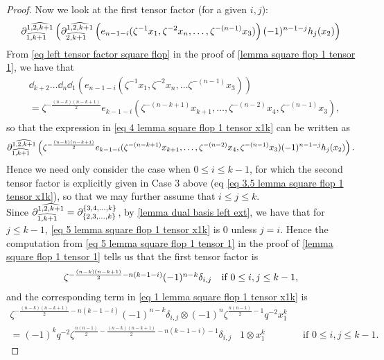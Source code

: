 \begin{proof}
    Now we look at the first tensor factor (for a given $i,j$):
    \begin{align}
        \partial^{\widehat{1,2, k+1}}_{\widehat{1,k+1}}\left(\partial^{\widehat{1,2,k+1}}_{\widehat{2,k+1}}\left(e_{n-1-i}(\zeta^{-1}x_1, \zeta^{-2}x_n, \ldots , \zeta^{-(n-1)}x_3)\right)(-1)^{n-1-j}h_{j}(x_2)\right) \label{eq 4 lemma square flop 1 tensor x1k}
    \end{align}
     From \eqref{eq left tensor factor square flop} in the proof of \cref{lemma square flop 1 tensor 1}, we have that
     \begin{align*}
         &\dd_{k+2}\ldots \dd_n \dd_1 (e_{n-1-i}(\zeta^{-1}x_1, \zeta^{-2}x_n, \ldots \zeta^{-(n-1)}x_3))\\
         &= \zeta^{-\frac{(n-k)(n-k+1)}{2}}e_{k-1-i}(\zeta^{-(n-k+1)}x_{k+1}, \ldots, \zeta^{-(n-2)}x_4, \zeta^{-(n-1)}x_3),
     \end{align*}
     so that the expression in \eqref{eq 4 lemma square flop 1 tensor x1k} can be written as
     \begin{align}
       \partial^{\widehat{1,2, k+1}}_{\widehat{1,k+1}}\left(\zeta^{-\frac{(n-k)(n-k+1)}{2}}e_{k-1-i}(\zeta^{-(n-k+1)}x_{k+1}, \ldots, \zeta^{-(n-2)}x_4, \zeta^{-(n-1)}x_3)(-1)^{n-1-j}h_{j}(x_2)\right) \label{eq 5 lemma square flop 1 tensor x1k}  .
     \end{align}
     Hence we need only consider the case when $0\leq i\leq k-1$,  for which the second tensor factor is explicitly given in Case 3 above (eq \eqref{eq 3.5 lemma square flop 1 tensor x1k}), so that we may further assume that $i\leq j \leq k$.\\
     Since $\partial^{\widehat{1,2,k+1}}_{\widehat{1,k+1}}=\partial^{\{3,4, \ldots, k\}}_{\{2, 3, \ldots, k\}}$, by \cref{lemma dual basis left ext}, we have that for $j\leq k-1$, 
     \eqref{eq 5 lemma square flop 1 tensor x1k} is $0$ unless $j=i$.
     Hence the computation from \eqref{eq 5 lemma square flop 1 tensor 1} in the proof of \cref{lemma square flop 1 tensor 1} tells us that the first tensor factor is 
     \begin{align}
    \begin{array}{cc}
    \notag \zeta^{-\frac{(n-k)(n-k+1)}{2}-n(k-1-i)} (-1)^{n-k} \delta_{i,j}  &\text{if $0\leq i,j \leq k-1$,}
    \end{array}
     \end{align}
     and the corresponding term in \eqref{eq 1 lemma square flop 1 tensor x1k} is 
     \begin{align}
         \zeta^{-\frac{(n-k)(n-k+1)}{2}-n(k-1-i)} (-1)^{n-k}\delta_{i,j} \otimes (-1)^{n}\zeta^{\frac{n(n-1)}{2}-1}q^{-2}x_1^k \\
         =(-1)^{k}q^{-2} \zeta^{\frac{n(n-1)}{2}-\frac{(n-k)(n-k+1)}{2}-n(k-1-i)-1}\delta_{i,j} \;\;\;1\otimes x_1^k
         \label{eq 6 lemma square flop 1 tensor x1k} &&\text{if $0\leq i,j \leq k-1$.}
     \end{align}
     

\end{proof}
